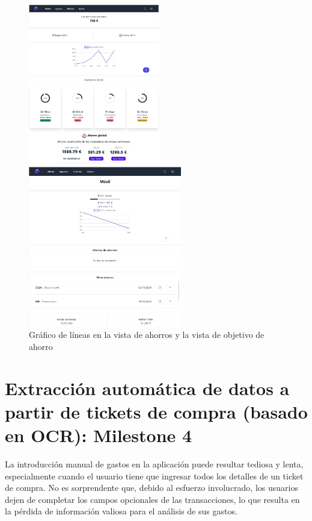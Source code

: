 \begin{figure}[ht!]
    \centering
    \begin{minipage}{0.45\textwidth}
        \centering
        \includegraphics[height=70mm]{imagenes/M3-ahorros.jpg}
    \end{minipage}\hfill
    \begin{minipage}{0.45\textwidth}
        \centering
        \includegraphics[height=70mm]{imagenes/M3-ahorros-objetivo.jpg}
    \end{minipage}
    \caption{Gráfico de líneas en la vista de ahorros y la vista de objetivo de ahorro}
    \label{fig:line_chart}
\end{figure}


\section{Extracción automática de datos a partir de tickets de compra (basado en OCR): Milestone 4}\label{chap:milestone4}

La introducción manual de gastos en la aplicación puede resultar tediosa y lenta, especialmente cuando el usuario tiene que ingresar todos los detalles de un ticket de compra. No es sorprendente que, debido al esfuerzo involucrado, los usuarios dejen de completar los campos opcionales de las transacciones, lo que resulta en la pérdida de información valiosa para el análisis de sus gastos.

